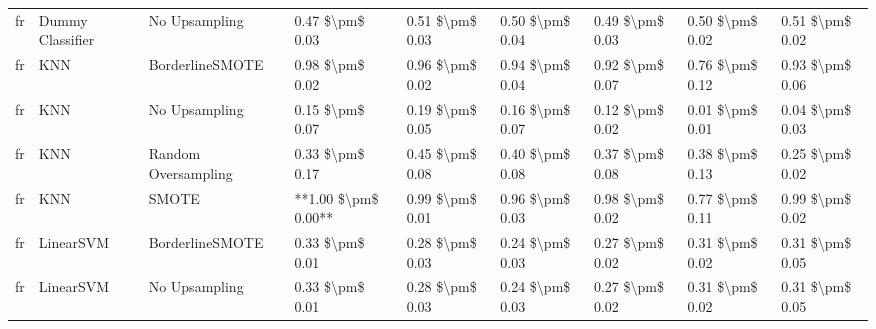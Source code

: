 \begin{tabular}{lllllllll}
      fr &                Dummy Classifier &                 No Upsampling &     0.47 \$\textbackslash pm\$ 0.03 &           0.51 \$\textbackslash pm\$ 0.03 &       0.50 \$\textbackslash pm\$ 0.04 &        0.49 \$\textbackslash pm\$ 0.03 &                         0.50 \$\textbackslash pm\$ 0.02 &     0.51 \$\textbackslash pm\$ 0.02 \\
      fr &                             KNN &               BorderlineSMOTE &     0.98 \$\textbackslash pm\$ 0.02 &           0.96 \$\textbackslash pm\$ 0.02 &       0.94 \$\textbackslash pm\$ 0.04 &        0.92 \$\textbackslash pm\$ 0.07 &                         0.76 \$\textbackslash pm\$ 0.12 &     0.93 \$\textbackslash pm\$ 0.06 \\
      fr &                             KNN &                 No Upsampling &     0.15 \$\textbackslash pm\$ 0.07 &           0.19 \$\textbackslash pm\$ 0.05 &       0.16 \$\textbackslash pm\$ 0.07 &        0.12 \$\textbackslash pm\$ 0.02 &                         0.01 \$\textbackslash pm\$ 0.01 &     0.04 \$\textbackslash pm\$ 0.03 \\
      fr &                             KNN &           Random Oversampling &     0.33 \$\textbackslash pm\$ 0.17 &           0.45 \$\textbackslash pm\$ 0.08 &       0.40 \$\textbackslash pm\$ 0.08 &        0.37 \$\textbackslash pm\$ 0.08 &                         0.38 \$\textbackslash pm\$ 0.13 &     0.25 \$\textbackslash pm\$ 0.02 \\
      fr &                             KNN &                         SMOTE & **1.00 \$\textbackslash pm\$ 0.00** &           0.99 \$\textbackslash pm\$ 0.01 &       0.96 \$\textbackslash pm\$ 0.03 &        0.98 \$\textbackslash pm\$ 0.02 &                         0.77 \$\textbackslash pm\$ 0.11 &     0.99 \$\textbackslash pm\$ 0.02 \\
      fr &                       LinearSVM &               BorderlineSMOTE &     0.33 \$\textbackslash pm\$ 0.01 &           0.28 \$\textbackslash pm\$ 0.03 &       0.24 \$\textbackslash pm\$ 0.03 &        0.27 \$\textbackslash pm\$ 0.02 &                         0.31 \$\textbackslash pm\$ 0.02 &     0.31 \$\textbackslash pm\$ 0.05 \\
      fr &                       LinearSVM &                 No Upsampling &     0.33 \$\textbackslash pm\$ 0.01 &           0.28 \$\textbackslash pm\$ 0.03 &       0.24 \$\textbackslash pm\$ 0.03 &        0.27 \$\textbackslash pm\$ 0.02 &                         0.31 \$\textbackslash pm\$ 0.02 &     0.31 \$\textbackslash pm\$ 0.05 \\

\end{tabular}
